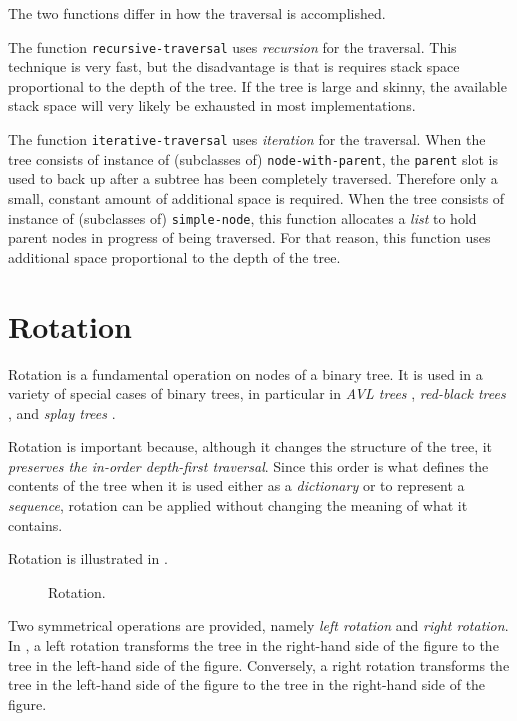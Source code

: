 The two functions differ in how the traversal is accomplished.

The function \texttt{recursive-traversal} uses \emph{recursion} for
the traversal.  This technique is very fast, but the disadvantage is
that is requires stack space proportional to the depth of the tree.
If the tree is large and skinny, the available stack space will very
likely be exhausted in most \commonlisp{} implementations.

The function \texttt{iterative-traversal} uses \emph{iteration} for
the traversal.  When the tree consists of instance of (subclasses of)
\texttt{node-with-parent}, the \texttt{parent} slot is used to back up
after a subtree has been completely traversed.  Therefore only a
small, constant amount of additional space is required.  When the tree
consists of instance of (subclasses of) \texttt{simple-node}, this
function allocates a \emph{list} to hold parent nodes in progress of
being traversed.  For that reason, this function uses additional space
proportional to the depth of the tree.

\section{Rotation}
\label{sec-rotation}

Rotation is a fundamental operation on nodes of a binary tree.  It is
used in a variety of special cases of binary trees, in particular in
\emph{AVL trees} \cite{Adelson-Velskii_Landis_1962}, \emph{red-black
  trees} \cite{Guibas:1978:DFB:1382432.1382565}, and \emph{splay
  trees} \cite{Sleator:1985:SBS:3828.3835}.

Rotation is important because, although it changes the structure of
the tree, it \emph{preserves the in-order depth-first traversal}.
Since this order is what defines the contents of the tree when it is
used either as a \emph{dictionary} or to represent a \emph{sequence},
rotation can be applied without changing the meaning of what it
contains.

Rotation is illustrated in .

\begin{figure}
\begin{center}
\end{center}
\caption{\label{fig-rotation}
Rotation.}
\end{figure}

Two symmetrical operations are provided, namely \emph{left rotation}
and \emph{right rotation}.  In , a left rotation
transforms the tree in the right-hand side of the figure to the tree
in the left-hand side of the figure.  Conversely, a right rotation
transforms the tree in the left-hand side of the figure to the tree
in the right-hand side of the figure.


